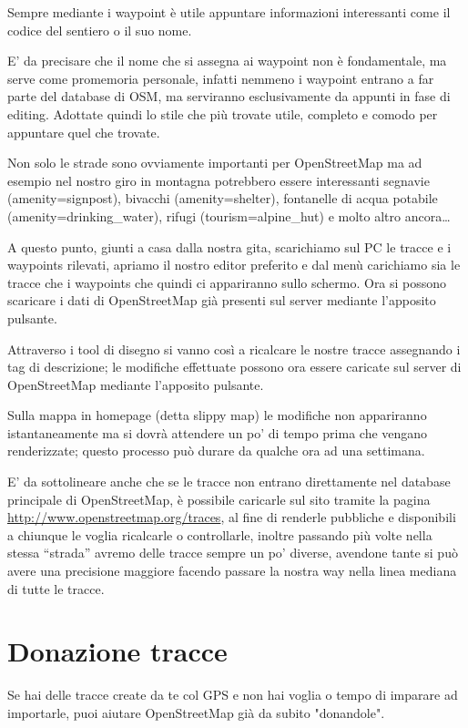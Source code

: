 \documentclass[a4paper,twoside,12pt,]{article}
\newcommand{\osm}{OpenStreetMap\xspace}
\newcommand{\gps}{GPS\xspace}
\begin{document}
Sempre mediante i waypoint è utile appuntare informazioni interessanti come il codice del sentiero o il suo nome.

E' da precisare che il nome che si assegna ai waypoint non è fondamentale, ma serve come promemoria personale, infatti nemmeno i waypoint entrano a far parte del database di OSM, ma serviranno esclusivamente da appunti in fase di editing. Adottate quindi lo stile che più trovate utile, completo e comodo per appuntare quel che trovate.

Non solo le strade sono ovviamente importanti per \osm ma ad esempio nel nostro giro in montagna potrebbero essere interessanti segnavie (amenity=signpost), bivacchi (amenity=shelter), fontanelle di acqua potabile (amenity=drinking\_water),  rifugi (tourism=alpine\_hut) e molto altro ancora\dots

A questo punto, giunti a casa dalla nostra gita, scarichiamo sul PC le tracce e i waypoints rilevati, apriamo il nostro editor preferito e dal menù carichiamo sia le tracce che i waypoints che quindi ci appariranno sullo schermo. Ora si possono scaricare i dati di \osm già presenti sul server mediante l'apposito pulsante.

Attraverso i tool di disegno si vanno così a ricalcare le nostre tracce assegnando i tag di descrizione; le modifiche effettuate possono ora essere caricate sul server di \osm mediante l'apposito pulsante.

Sulla mappa in homepage (detta slippy map) le modifiche non appariranno istantaneamente ma si dovrà attendere un po' di tempo prima che vengano renderizzate; questo processo può durare da qualche ora ad una settimana.

E' da sottolineare anche che se le tracce non entrano direttamente nel database principale di \osm, è possibile caricarle sul sito tramite la pagina \url{http://www.openstreetmap.org/traces}, al fine di renderle pubbliche e disponibili a chiunque le voglia ricalcarle o controllarle, inoltre passando più volte nella stessa ``strada'' avremo delle tracce sempre un po' diverse, avendone tante si può avere una precisione maggiore facendo passare la nostra way nella linea mediana di tutte le tracce.
\section{Donazione tracce}
Se hai delle tracce create da te col \gps e non hai voglia o tempo di imparare ad importarle, puoi aiutare \osm già da subito "donandole".
\end{document}
